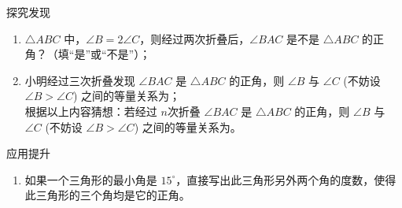 \documentclass[11pt,a4paper]{ctexart}
\begin{document}
\begin{enumerate}
    \vspace{0.3cm}
    \noindent 探究发现
    \begin{enumerate}
        \item[(1)] $\triangle ABC$ 中，$\angle B=2\angle C$，则经过两次折叠后，$\angle BAC$ 是不是 $\triangle ABC$ 的正角？\underline{\hspace{2cm}}（填“是”或“不是”）；
        \vspace{2.5cm}
        
        \item[(2)] 小明经过三次折叠发现 $\angle BAC$ 是 $\triangle ABC$ 的正角，则 $\angle B$ 与 $\angle C$ (不妨设 $\angle B > \angle C$) 之间的等量关系为\underline{\hspace{3cm}}；\\
        根据以上内容猜想：若经过 $n$次折叠 $\angle BAC$ 是 $\triangle ABC$ 的正角，则 $\angle B$ 与 $\angle C$ (不妨设 $\angle B > \angle C$) 之间的等量关系为\underline{\hspace{3cm}}。
        \vspace{3.5cm}
    \end{enumerate}
    
    \noindent 应用提升
    \begin{enumerate}
        \item[(3)] 如果一个三角形的最小角是 $15^\circ$，直接写出此三角形另外两个角的度数，使得此三角形的三个角均是它的正角。
        \vspace{3.5cm}
    \end{enumerate}
\end{enumerate}
\end{document}
